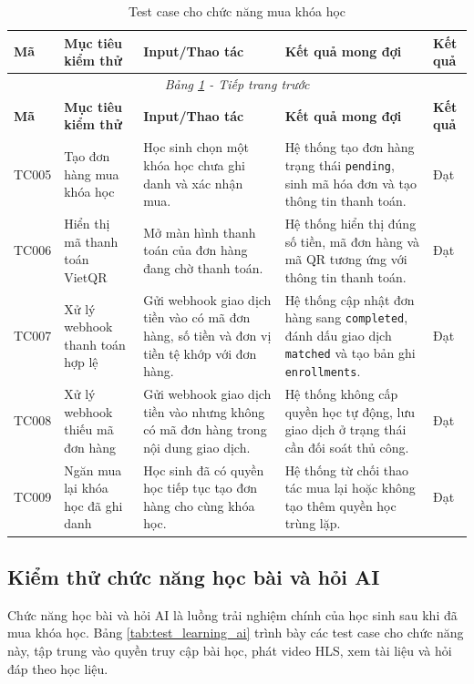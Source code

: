 \documentclass[../DoAn.tex]{subfiles}
\begin{document}
\small
\setlength{\tabcolsep}{3pt}
\renewcommand{\arraystretch}{1.25}
\begin{longtable}{|p{}|p{}|p{}|p{}|p{}|}
\caption{Test case cho chức năng mua khóa học}
\label{tab:test_purchase}\\
\hline
\textbf{Mã} & \textbf{Mục tiêu kiểm thử} & \textbf{Input/Thao tác} & \textbf{Kết quả mong đợi} & \textbf{Kết quả} \\ \hline
\endfirsthead
\multicolumn{5}{c}{\textit{Bảng \ref{tab:test_purchase} - Tiếp trang trước}}\\
\hline
\textbf{Mã} & \textbf{Mục tiêu kiểm thử} & \textbf{Input/Thao tác} & \textbf{Kết quả mong đợi} & \textbf{Kết quả} \\ \hline
\endhead
TC005 & Tạo đơn hàng mua khóa học & Học sinh chọn một khóa học chưa ghi danh và xác nhận mua. & Hệ thống tạo đơn hàng trạng thái \texttt{pending}, sinh mã hóa đơn và tạo thông tin thanh toán. & Đạt \\ \hline
TC006 & Hiển thị mã thanh toán VietQR & Mở màn hình thanh toán của đơn hàng đang chờ thanh toán. & Hệ thống hiển thị đúng số tiền, mã đơn hàng và mã QR tương ứng với thông tin thanh toán. & Đạt \\ \hline
TC007 & Xử lý webhook thanh toán hợp lệ & Gửi webhook giao dịch tiền vào có mã đơn hàng, số tiền và đơn vị tiền tệ khớp với đơn hàng. & Hệ thống cập nhật đơn hàng sang \texttt{completed}, đánh dấu giao dịch \texttt{matched} và tạo bản ghi \texttt{enrollments}. & Đạt \\ \hline
TC008 & Xử lý webhook thiếu mã đơn hàng & Gửi webhook giao dịch tiền vào nhưng không có mã đơn hàng trong nội dung giao dịch. & Hệ thống không cấp quyền học tự động, lưu giao dịch ở trạng thái cần đối soát thủ công. & Đạt \\ \hline
TC009 & Ngăn mua lại khóa học đã ghi danh & Học sinh đã có quyền học tiếp tục tạo đơn hàng cho cùng khóa học. & Hệ thống từ chối thao tác mua lại hoặc không tạo thêm quyền học trùng lặp. & Đạt \\ \hline
\end{longtable}
\normalsize

\subsection{Kiểm thử chức năng học bài và hỏi AI}

Chức năng học bài và hỏi AI là luồng trải nghiệm chính của học sinh sau khi đã mua khóa học. Bảng \ref{tab:test_learning_ai} trình bày các test case cho chức năng này, tập trung vào quyền truy cập bài học, phát video HLS, xem tài liệu và hỏi đáp theo học liệu.
\end{document}
